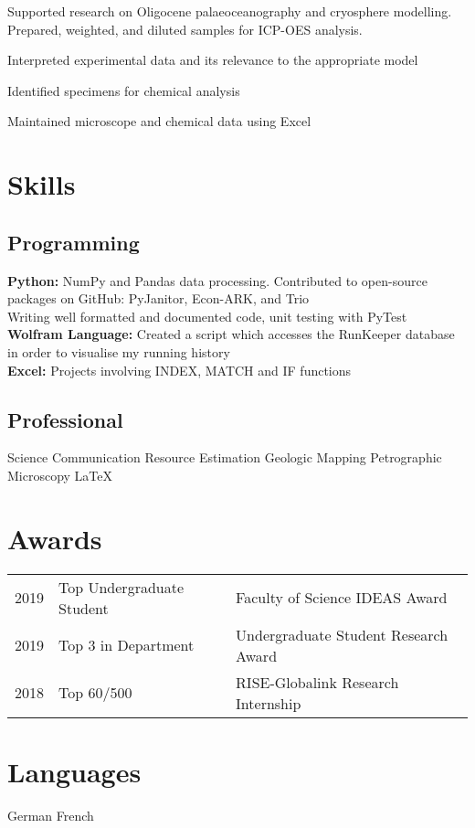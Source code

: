 \documentclass[]{deedy-resume-openfont}
\begin{document}
Supported research on Oligocene palaeoceanography and cryosphere modelling. Prepared, weighted, and diluted samples for ICP-OES analysis. 
\begin{tightemize}
\item Interpreted experimental data and its relevance to the appropriate model
\item Identified specimens for chemical analysis 
\item Maintained microscope and chemical data using Excel 
\end{tightemize}
\sectionsep


%
%
\section{Skills} 

\subsection{Programming}

\textbf{Python:} NumPy and Pandas data processing. Contributed to open-source packages on GitHub: PyJanitor, Econ-ARK, and Trio \\
Writing well formatted and documented code, unit testing with PyTest \\
\textbf{Wolfram Language:} Created a script which accesses the RunKeeper database in order to visualise my running history \\
\textbf{Excel:} Projects involving INDEX, MATCH and IF functions 
\sectionsep


\subsection{Professional}
Science Communication \textbullet{} Resource Estimation \textbullet{} Geologic Mapping \textbullet{} Petrographic Microscopy  \textbullet{}  \LaTeX 
\sectionsep


\section{Awards} 
\begin{tabular}{rll}
2019		&  Top Undergraduate Student & Faculty of Science IDEAS Award \\
2019		&  Top 3 in Department & Undergraduate Student Research Award \\
2018		&  Top 60/500  & RISE-Globalink Research Internship \\
 \end{tabular}
\sectionsep

\section{Languages} 
German \textbullet{} French
\sectionsep
\end{document}
